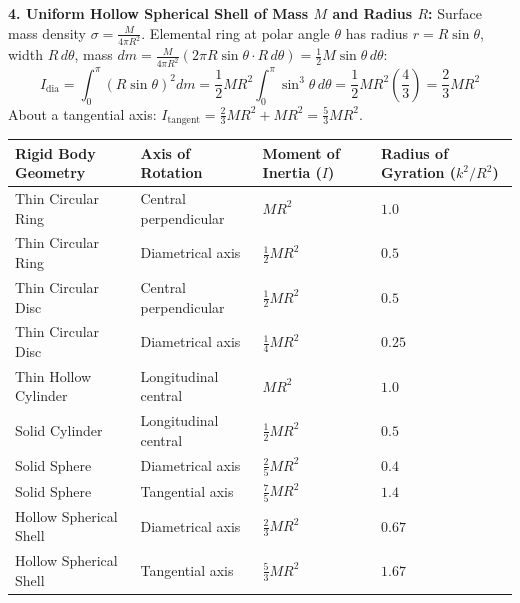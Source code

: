 \documentclass[10pt,twoside,openright]{book}
\begin{document}
\begin{formulabox}
\textbf{4. Uniform Hollow Spherical Shell of Mass $M$ and Radius $R$:}
Surface mass density $\sigma = \frac{M}{4\pi R^2}$. Elemental ring at polar angle $\theta$ has radius $r = R\sin\theta$, width $R\,d\theta$, mass $dm = \frac{M}{4\pi R^2}(2\pi R\sin\theta \cdot R\,d\theta) = \frac{1}{2}M\sin\theta\,d\theta$:
\begin{equation}
  I_{\text{dia}} = \int_0^\pi (R\sin\theta)^2 dm = \frac{1}{2}MR^2\int_0^\pi \sin^3\theta\,d\theta = \frac{1}{2}MR^2\left(\frac{4}{3}\right) = \frac{2}{3}MR^2
\end{equation}
About a tangential axis: $I_{\text{tangent}} = \frac{2}{3}MR^2 + MR^2 = \frac{5}{3}MR^2$.
\end{formulabox}

\begin{usecasebox}
\begin{center}
\begin{tabularx}{\linewidth}{|L|L|Y|Y|}
\toprule
\textbf{Rigid Body Geometry} & \textbf{Axis of Rotation} & \textbf{Moment of Inertia ($I$)} & \textbf{Radius of Gyration ($k^2/R^2$)} \\
\midrule
Thin Circular Ring & Central perpendicular & $MR^2$ & $1.0$ \\
Thin Circular Ring & Diametrical axis & $\frac{1}{2}MR^2$ & $0.5$ \\
Thin Circular Disc & Central perpendicular & $\frac{1}{2}MR^2$ & $0.5$ \\
Thin Circular Disc & Diametrical axis & $\frac{1}{4}MR^2$ & $0.25$ \\
Thin Hollow Cylinder & Longitudinal central & $MR^2$ & $1.0$ \\
Solid Cylinder & Longitudinal central & $\frac{1}{2}MR^2$ & $0.5$ \\
Solid Sphere & Diametrical axis & $\frac{2}{5}MR^2$ & $0.4$ \\
Solid Sphere & Tangential axis & $\frac{7}{5}MR^2$ & $1.4$ \\
Hollow Spherical Shell & Diametrical axis & $\frac{2}{3}MR^2$ & $0.67$ \\
Hollow Spherical Shell & Tangential axis & $\frac{5}{3}MR^2$ & $1.67$ \\
\bottomrule
\end{tabularx}
\end{center}
\end{usecasebox}

\end{document}
